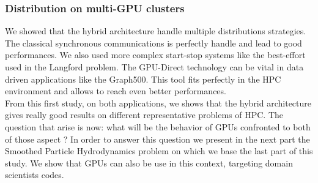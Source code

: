 \subsubsection{Distribution on multi-GPU clusters}
We showed that the hybrid architecture handle multiple distributions strategies. 
The classical synchronous communications is perfectly handle and lead to good performances. 
We also used more complex start-stop systems like the best-effort used in the Langford problem. 
The GPU-Direct technology can be vital in data driven applications like the Graph500.
This tool fits perfectly in the HPC environment and allows to reach even better performances. \\

From this first study, on both applications, we shows that the hybrid architecture gives really good results on different representative problems of HPC. 
The question that arise is now: what will be the behavior of GPUs confronted to both of those aspect ? 
In order to answer this question we present in the next part the Smoothed Particle Hydrodynamics problem on which we base the last part of this study. 
We show that GPUs can also be use in this context, targeting domain scientists codes.\\

